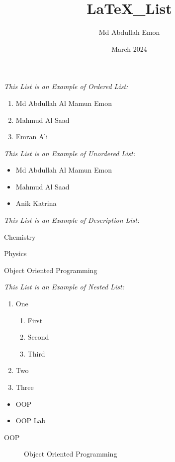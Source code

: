 \documentclass{article}
\title{LaTeX_List}
\author{Md Abdullah Emon}
\date{March 2024}
\begin{document}
\textit{This List is an Example of Ordered List: }\\
\begin{enumerate}
    \item Md Abdullah Al Mamun Emon
    \item Mahmud Al Saad
    \item Emran Ali
\end{enumerate}



\textit{This List is an Example of Unordered List: }\\
\begin{itemize}
    \item Md Abdullah Al Mamun Emon
    \item Mahmud Al Saad
    \item Anik Katrina
\end{itemize}



\textit{This List is an Example of Description List: }\\
\begin{description}
    \item Chemistry
    \item Physics
    \item[CSE] Object Oriented Programming
\end{description}



\textit{This List is an Example of Nested List: }\\
\begin{enumerate}
    \item One
    \begin{enumerate}
        \item First
        \item Second
        \item Third
    \end{enumerate}
    \item Two
    \item Three
\end{enumerate}


\begin{itemize}
    \item OOP
    \item OOP Lab
\end{itemize}

\begin{description}
    \item[OOP] Object Oriented Programming
\end{description}
\end{document}
